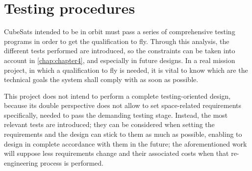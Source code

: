 %
%

\section{Testing procedures} \label{testing}

CubeSats intended to be in orbit must pass a series of comprehensive testing programs in order to get the qualification to fly. Through this analysis, the different tests performed are introduced, so the constraints can be taken into account in \autoref{chap:chapter4}, and especially in future designs. In a real mission project, in which a qualification to fly is needed, it is vital to know which are the technical goals the system shall comply with as soon as possible.

This project does not intend to perform a complete testing-oriented design, because its double perspective does not allow to set space-related requirements specifically, needed to pass the demanding testing stage. Instead, the most relevant tests are introduced; they can be considered when setting the requirements and the design can stick to them as much as possible, enabling to design in complete accordance with them in the future; the aforementioned work will suppose less requirements change and their associated costs when that re-engineering process is performed.

